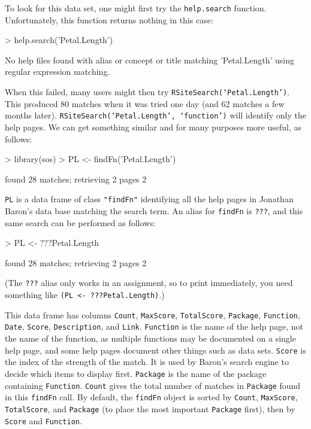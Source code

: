 \documentclass[a4paper]{report}
\begin{document}
\begin{article}
To look for this data set, one might first try
the {\tt help.search} function.  Unfortunately, this function
returns nothing in this case:
\begin{Schunk}
\begin{Sinput}
> help.search('Petal.Length')
\end{Sinput}
\begin{Soutput}
No help files found with alias or concept or title
matching 'Petal.Length' using regular expression
matching.
\end{Soutput}
\end{Schunk}
When this failed, many users might then try
{\tt RSiteSearch(`Petal.Length')}.  This produced 80 matches
when it was tried one day (and 62 matches a few months later).
{\tt RSiteSearch(`Petal.Length', `function')} will identify
only the help pages.  We can get something similar and for
many purposes more useful, as follows:
\begin{Schunk}
\begin{Sinput}
> library(sos)
> PL <- findFn('Petal.Length')
\end{Sinput}
\begin{Soutput}
found 28 matches;  retrieving 2 pages
2 
\end{Soutput}
\end{Schunk}
{\tt PL} is a data frame of class {\tt "findFn"} identifying
all the help pages in Jonathan Baron's data base matching the
search term.  An alias for {\tt findFn} is {\tt ???}, and this same
search can be performed as follows:
\begin{Schunk}
\begin{Sinput}
> PL <- ???Petal.Length
\end{Sinput}
\begin{Soutput}
found 28 matches;  retrieving 2 pages
2 
\end{Soutput}
\end{Schunk}
(The {\tt ???} alias only works in an assignment, so to print
immediately, you need something like {\tt (PL <- ???Petal.Length)}.)

This data frame has columns {\tt Count},
{\tt MaxScore}, {\tt TotalScore}, {\tt Package}, {\tt Function},
{\tt Date}, {\tt Score}, {\tt Description}, and {\tt Link}.
{\tt Function} is the name of the help page, not the name of the
function, as multiple functions may be documented on a single
help page, and some help pages document other things such as data
sets.  {\tt Score} is the index of the strength of the match.  It is used
by Baron's search engine to decide which items to display first.
{\tt Package} is the name of the package containing {\tt Function}.
{\tt Count} gives the total number of matches in {\tt Package} found in this
{\tt findFn} call.  By default, the {\tt findFn} object is sorted by
{\tt Count}, {\tt MaxScore}, {\tt TotalScore},
and {\tt Package} (to place the most important {\tt Package}
first), then by {\tt Score} and {\tt Function}.


\end{article}
\end{document}
